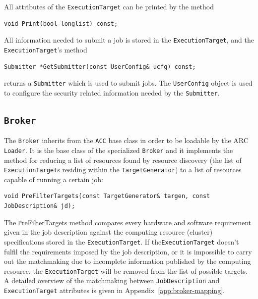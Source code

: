 \documentclass{book}
\newcommand{\ACC}{\texttt{ACC}}
\newcommand{\Broker}{\texttt{Broker}}
\newcommand{\ExecutionTarget}{\texttt{ExecutionTarget}}
\newcommand{\JobDescription}{\texttt{JobDescription}}
\newcommand{\TargetGenerator}{\texttt{TargetGenerator}}
\newcommand{\Submitter}{\texttt{Submitter}}
\newcommand{\UserConfig}{\texttt{UserConfig}}
\begin{document}
All attributes of the {\ExecutionTarget} can be printed by the method

\begin{shaded}
\begin{verbatim}
void Print(bool longlist) const;
\end{verbatim}
\end{shaded}

All information needed to submit a job is stored in the {\ExecutionTarget}, 
and the {\ExecutionTarget}'s method

\begin{shaded}
\begin{verbatim}
Submitter *GetSubmitter(const UserConfig& ucfg) const;
\end{verbatim}
\end{shaded}

returns a {\Submitter} which is used to submit jobs. The {\UserConfig} object 
is used to configure the security related information needed by the {\Submitter}.

\subsection{{\Broker}}

The {\Broker} inherits from the {\ACC} base class in order to be loadable by the ARC \texttt{Loader}. It is the base class of the 
specialized {\Broker} and it implements the method for reducing a list of resources found by resource discovery (the list of 
{\ExecutionTarget}s residing within the {\TargetGenerator}) to a list of resources capable of running a certain job:

\begin{shaded}
\begin{verbatim}
void PreFilterTargets(const TargetGenerator& targen, const JobDescription& jd);
\end{verbatim}
\end{shaded}

The {\texttt PreFilterTargets} method compares every hardware and software requirement given in the job description against the 
computing resource (cluster) specifications stored in the {\ExecutionTarget}. If the{\ExecutionTarget} doesn't fulfil 
the requirements imposed by the job description, or it is impossible to carry out the matchmaking due to incomplete information 
published by the computing resource, the {\ExecutionTarget} will be removed from the list of possible targets. A detailed overview 
of the matchmaking between {\JobDescription} and {\ExecutionTarget} attributes is given in Appendix~\ref{app:broker-mapping}. 
 
\end{document}
